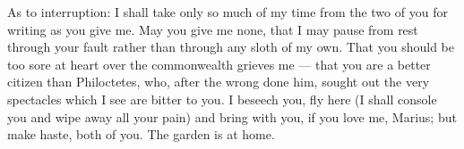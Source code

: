  As to interruption: I shall take only so much of my time from the two of you for writing as you give me. May you give me none, that I may pause from rest through your fault rather than through any sloth of my own. That you should be too sore at heart over the commonwealth grieves me — that you are a better citizen than Philoctetes, who, after the wrong done him, sought out the very spectacles which I see are bitter to you. I beseech you, fly here (I shall console you and wipe away all your pain) and bring with you, if you love me, Marius; but make haste, both of you. The garden is at home.
